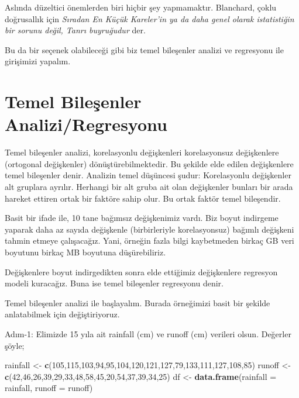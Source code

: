 \documentclass[
]{book}
\newenvironment{Shaded}{\begin{snugshade}}{\end{snugshade}}
\newcommand{\DataTypeTok}[1]{\textcolor[rgb]{0.13,0.29,0.53}{#1}}
\newcommand{\DecValTok}[1]{\textcolor[rgb]{0.00,0.00,0.81}{#1}}
\newcommand{\KeywordTok}[1]{\textcolor[rgb]{0.13,0.29,0.53}{\textbf{#1}}}
\newcommand{\NormalTok}[1]{#1}
\newcommand{\StringTok}[1]{\textcolor[rgb]{0.31,0.60,0.02}{#1}}
\begin{document}
Aslında düzeltici önemlerden biri hiçbir şey yapmamaktır. Blanchard, çoklu doğrusallık için \emph{Sıradan En Küçük Kareler'in ya da daha genel olarak istatistiğin bir sorunu değil, Tanrı buyruğudur} der.

Bu da bir seçenek olabileceği gibi biz temel bileşenler analizi ve regresyonu ile girişimizi yapalım.

\hypertarget{temel-bileux15fenler-analiziregresyonu}{%
\section{Temel Bileşenler Analizi/Regresyonu}\label{temel-bileux15fenler-analiziregresyonu}}

Temel bileşenler analizi, korelasyonlu değişkenleri korelasyonsuz değişkenlere (ortogonal değişkenler) dönüştürebilmektedir. Bu şekilde elde edilen değişkenlere temel bileşenler denir. Analizin temel düşüncesi şudur: Korelasyonlu değişkenler alt gruplara ayrılır. Herhangi bir alt gruba ait olan değişkenler bunları bir arada hareket ettiren ortak bir faktöre sahip olur. Bu ortak faktör temel bileşendir.

Basit bir ifade ile, 10 tane bağımsız değişkenimiz vardı. Biz boyut indirgeme yaparak daha az sayıda değişkenle (birbirleriyle korelasyonsuz) bağımlı değişkeni tahmin etmeye çalışacağız. Yani, örneğin fazla bilgi kaybetmeden birkaç GB veri boyutunu birkaç MB boyutuna düşürebiliriz.

Değişkenlere boyut indirgedikten sonra elde ettiğimiz değişkenlere regresyon modeli kuracağız. Buna ise temel bileşenler regresyonu denir.

Temel bileşenler analizi ile başlayalım. Burada örneğimizi basit bir şekilde anlatabilmek için değiştiriyoruz.

Adım-1: Elimizde 15 yıla ait rainfall (cm) ve runoff (cm) verileri olsun. Değerler şöyle;

\begin{Shaded}
\begin{Highlighting}[]
\NormalTok{rainfall <-}\StringTok{ }\KeywordTok{c}\NormalTok{(}\DecValTok{105}\NormalTok{,}\DecValTok{115}\NormalTok{,}\DecValTok{103}\NormalTok{,}\DecValTok{94}\NormalTok{,}\DecValTok{95}\NormalTok{,}\DecValTok{104}\NormalTok{,}\DecValTok{120}\NormalTok{,}\DecValTok{121}\NormalTok{,}\DecValTok{127}\NormalTok{,}\DecValTok{79}\NormalTok{,}\DecValTok{133}\NormalTok{,}\DecValTok{111}\NormalTok{,}\DecValTok{127}\NormalTok{,}\DecValTok{108}\NormalTok{,}\DecValTok{85}\NormalTok{)}
\NormalTok{runoff <-}\StringTok{ }\KeywordTok{c}\NormalTok{(}\DecValTok{42}\NormalTok{,}\DecValTok{46}\NormalTok{,}\DecValTok{26}\NormalTok{,}\DecValTok{39}\NormalTok{,}\DecValTok{29}\NormalTok{,}\DecValTok{33}\NormalTok{,}\DecValTok{48}\NormalTok{,}\DecValTok{58}\NormalTok{,}\DecValTok{45}\NormalTok{,}\DecValTok{20}\NormalTok{,}\DecValTok{54}\NormalTok{,}\DecValTok{37}\NormalTok{,}\DecValTok{39}\NormalTok{,}\DecValTok{34}\NormalTok{,}\DecValTok{25}\NormalTok{)}
\NormalTok{df <-}\StringTok{ }\KeywordTok{data.frame}\NormalTok{(}\DataTypeTok{rainfall =}\NormalTok{ rainfall, }\DataTypeTok{runoff =}\NormalTok{ runoff)}
\end{Highlighting}
\end{Shaded}
\end{document}
